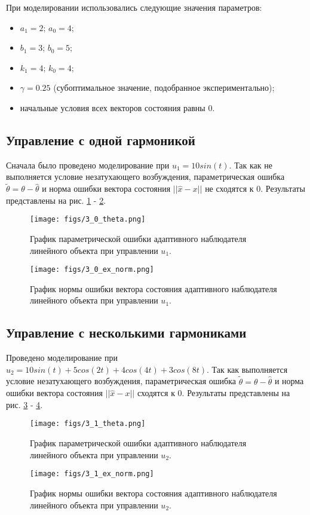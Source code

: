\documentclass{article}
\begin{document}
При моделировании использовались следующие значения параметров: 
\begin{itemize}
  \item \(a_1 = 2\); \(a_0 = 4\);
  \item \(b_1 = 3\); \(b_0 = 5\);
  \item \(k_1 = 4\); \(k_0 = 4\);
  \item $\gamma=0.25$ (субоптимальное значение, подобранное экспериментально);
  \item начальные условия всех векторов состояния равны 0.
\end{itemize}

\newpage
\subsection{Управление с одной гармоникой}
Сначала было проведено моделирование при \(u_1 = 10 sin(t)\). 
Так как не выполняется условие незатухающего возбуждения, параметрическая ошибка \(\tilde \theta = \theta - \hat \theta\) и норма ошибки вектора состояния \(||\hat x - x||\) не сходятся к 0. 
Результаты представлены на рис. \ref{fig:1_theta} - \ref{fig:1_xnorm}.
\begin{figure}[h!]
  \centering
  \texttt{[image: figs/3\_0\_theta.png]}
  \caption{График параметрической ошибки адаптивного наблюдателя линейного объекта при управлении \(u_1\).} 
  \label{fig:1_theta}
\end{figure}
\begin{figure}[h!]
  \centering
  \texttt{[image: figs/3\_0\_ex\_norm.png]}
  \caption{График нормы ошибки вектора состояния адаптивного наблюдателя линейного объекта при управлении \(u_1\).} 
  \label{fig:1_xnorm}
\end{figure}
\FloatBarrier
\newpage

\subsection{Управление с несколькими гармониками}
Проведено моделирование при \(u_2 = 10 sin(t) + 5 cos(2t) + 4cos(4t) + 3cos(8t)\). 
Так как выполняется условие незатухающего возбуждения, параметрическая ошибка \(\tilde \theta = \theta - \hat \theta\) и норма ошибки вектора состояния \(||\hat x - x||\) сходятся к 0. 
Результаты представлены на рис. \ref{fig:2_theta} - \ref{fig:2_xnorm}.
\begin{figure}[h!]
  \centering
  \texttt{[image: figs/3\_1\_theta.png]}
  \caption{График параметрической ошибки адаптивного наблюдателя линейного объекта при управлении \(u_2\).} 
  \label{fig:2_theta}
\end{figure}
\begin{figure}[h!]
  \centering
  \texttt{[image: figs/3\_1\_ex\_norm.png]}
  \caption{График нормы ошибки вектора состояния адаптивного наблюдателя линейного объекта при управлении \(u_2\).} 
  \label{fig:2_xnorm}
\end{figure}
\FloatBarrier
\newpage
\end{document}
